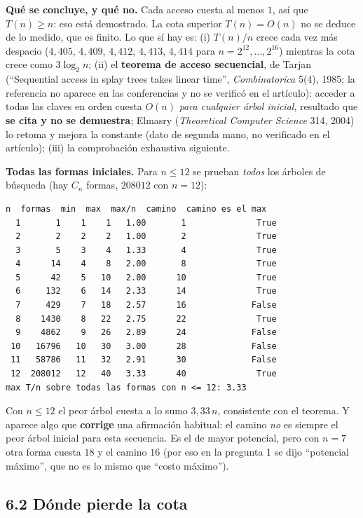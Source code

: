 \documentclass[11pt]{article}
\begin{document}
\textbf{Qué se concluye, y qué no.} Cada acceso cuesta al menos $1$, así que $T(n)\ge n$: eso está demostrado. La cota superior $T(n)=O(n)$ no se
deduce de lo medido, que es finito. Lo que sí hay es: (i) $T(n)/n$ crece cada vez más despacio ($4{,}405$, $4{,}409$, $4{,}412$, $4{,}413$, $4{,}414$ para
$n=2^{12},\dots,2^{16}$) mientras la cota crece como $3\log_2n$; (ii) el \textbf{teorema de acceso secuencial}, de Tarjan (``Sequential access in splay
trees takes linear time'', \emph{Combinatorica} 5(4), 1985; la referencia no aparece en las conferencias y no se verificó en el artículo): acceder a todas las claves en orden cuesta $O(n)$ \emph{para cualquier árbol inicial}, resultado que
\textbf{se cita y no se demuestra}; Elmasry (\emph{Theoretical Computer Science} 314, 2004) lo retoma y mejora la constante (dato de segunda mano, no verificado en el artículo); (iii) la comprobación exhaustiva siguiente.

\textbf{Todas las formas iniciales.} Para $n\le12$ se prueban \emph{todos} los árboles de búsqueda (hay $C_n$ formas, $208012$ con $n=12$):
\begin{lstlisting}[style=salida,basicstyle=\ttfamily\footnotesize\color{black},columns=fixed]
  n  formas  min  max  max/n  camino  camino es el max
  1       1    1    1   1.00       1              True
  2       2    2    2   1.00       2              True
  3       5    3    4   1.33       4              True
  4      14    4    8   2.00       8              True
  5      42    5   10   2.00      10              True
  6     132    6   14   2.33      14              True
  7     429    7   18   2.57      16             False
  8    1430    8   22   2.75      22              True
  9    4862    9   26   2.89      24             False
 10   16796   10   30   3.00      28             False
 11   58786   11   32   2.91      30             False
 12  208012   12   40   3.33      40              True
max T/n sobre todas las formas con n <= 12: 3.33
\end{lstlisting}
Con $n\le12$ el peor árbol cuesta a lo sumo $3{,}33\,n$, consistente con el teorema. Y aparece algo que \textbf{corrige} una afirmación habitual: el camino
\emph{no} es siempre el peor árbol inicial para esta secuencia. Es el de mayor potencial, pero con $n=7$ otra forma cuesta $18$ y el camino $16$ (por eso en
la pregunta 1 se dijo ``potencial máximo'', que no es lo mismo que ``costo máximo'').

\subsection*{6.2 Dónde pierde la cota}
\end{document}
